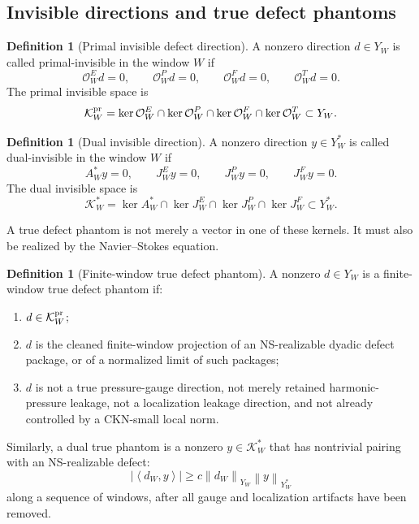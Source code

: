 \documentclass[11pt]{article}
\numberwithin{equation}{section}
\theoremstyle{plain}
\theoremstyle{definition}
\newtheorem{definition}[theorem]{Definition}
\theoremstyle{remark}
\newcommand{\norm}[2]{\left\|#1\right\|_{#2}}
\newcommand{\pair}[2]{\left\langle #1,#2\right\rangle}
\newcommand{\calK}{\mathcal K}
\newcommand{\calO}{\mathcal O}
\begin{document}
\subsection{Invisible directions and true defect phantoms}

\begin{definition}[Primal invisible defect direction]
A nonzero direction \(d\in Y_W\) is called primal-invisible in the window \(W\) if
\[
  \calO_W^E d=0,
  \qquad
  \calO_W^P d=0,
  \qquad
  \calO_W^F d=0,
  \qquad
  \calO_W^T d=0.
\]
The primal invisible space is
\[
  \calK_W^{\rm pr}
  =
  \ker\calO_W^E
  \cap\ker\calO_W^P
  \cap\ker\calO_W^F
  \cap\ker\calO_W^T
  \subset Y_W.
\]
\end{definition}

\begin{definition}[Dual invisible direction]
A nonzero direction \(y\in Y_W^*\) is called dual-invisible in the window \(W\) if
\[
  A_W^*y=0,
  \qquad
  J_W^Ey=0,
  \qquad
  J_W^Py=0,
  \qquad
  J_W^Fy=0.
\]
The dual invisible space is
\[
  \calK_W^*
  =
  \ker A_W^*
  \cap\ker J_W^E
  \cap\ker J_W^P
  \cap\ker J_W^F
  \subset Y_W^*.
\]
\end{definition}

A true defect phantom is not merely a vector in one of these kernels.  It must also be realized by the Navier--Stokes equation.

\begin{definition}[Finite-window true defect phantom]
A nonzero \(d\in Y_W\) is a finite-window true defect phantom if:
\begin{enumerate}
  \item \(d\in\calK_W^{\rm pr}\);
  \item \(d\) is the cleaned finite-window projection of an NS-realizable dyadic defect package, or of a normalized limit of such packages;
  \item \(d\) is not a true pressure-gauge direction, not merely retained harmonic-pressure leakage, not a localization leakage direction, and not already controlled by a CKN-small local norm.
\end{enumerate}
\end{definition}

Similarly, a dual true phantom is a nonzero \(y\in\calK_W^*\) that has nontrivial pairing with an NS-realizable defect:
\[
  |\pair{d_W}{y}|
  \ge
  c\norm{d_W}{Y_W}\norm{y}{Y_W^*}
\]
along a sequence of windows, after all gauge and localization artifacts have been removed.
\end{document}
